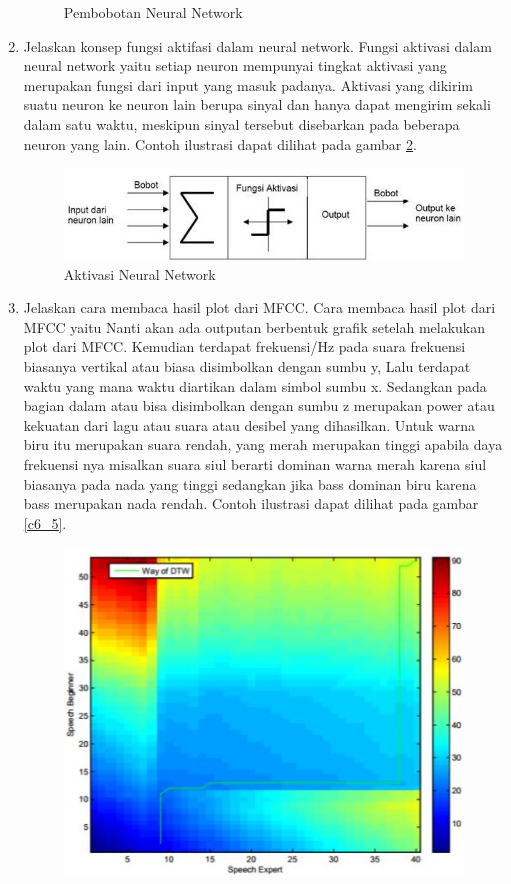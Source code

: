 \begin{enumerate}
\begin{figure}[!htbp]
	\caption{Pembobotan Neural Network}
	\label{c6_3}
\end{figure} 
\item Jelaskan konsep fungsi aktifasi dalam neural network.
\subitem Fungsi aktivasi dalam neural network yaitu setiap neuron mempunyai tingkat aktivasi yang merupakan fungsi dari input yang masuk padanya. Aktivasi yang dikirim suatu neuron ke neuron lain berupa sinyal dan hanya dapat mengirim sekali dalam satu waktu, meskipun sinyal tersebut disebarkan pada beberapa neuron yang lain. Contoh ilustrasi dapat dilihat pada gambar \ref{c6_4}.
\begin{figure}[!htbp]
	\centerline{\includegraphics[width=1\textwidth]{figures/huda/chapter6/4.JPG}}
	\caption{Aktivasi Neural Network}
	\label{c6_4}
\end{figure} 
\item Jelaskan cara membaca hasil plot dari MFCC.
\subitem Cara membaca hasil plot dari MFCC yaitu Nanti akan ada outputan berbentuk grafik setelah melakukan plot dari MFCC. Kemudian terdapat frekuensi/Hz pada suara frekuensi biasanya vertikal atau biasa disimbolkan dengan sumbu y, Lalu terdapat waktu yang mana waktu diartikan dalam simbol sumbu x. Sedangkan pada bagian dalam atau bisa disimbolkan dengan sumbu z merupakan power atau kekuatan dari lagu atau suara atau desibel yang dihasilkan. Untuk warna biru itu merupakan suara rendah, yang merah merupakan tinggi apabila daya frekuensi nya misalkan suara siul berarti dominan warna merah karena siul biasanya pada nada yang tinggi sedangkan jika bass dominan biru karena bass merupakan nada rendah. Contoh ilustrasi dapat dilihat pada gambar \ref{c6_5}.
\begin{figure}[!htbp]
	\centerline{\includegraphics[width=1\textwidth]{figures/huda/chapter6/5.JPG}}

\end{figure}
\end{enumerate}
